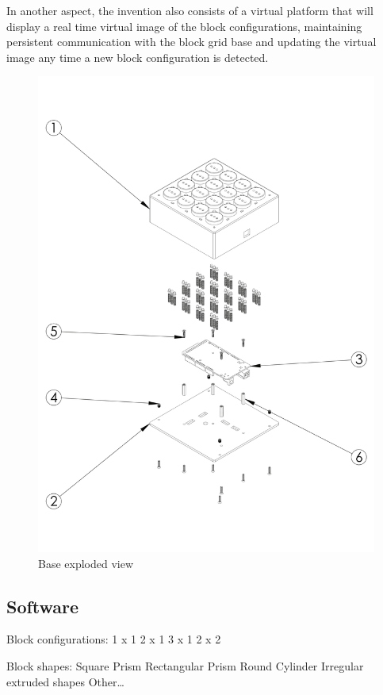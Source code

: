 \documentclass[]{article}
\begin{document}
In another aspect, the invention also consists of a virtual platform that will display a real time virtual image of the block configurations, maintaining persistent communication with the block grid base and updating the virtual image any time a new block configuration is detected.
\begin{figure}[H]
	\includegraphics[width=\textwidth]{Figures/base}
	\caption{Base exploded view}
\end{figure}

\subsection{Software}

Block configurations:
1 x 1
2 x 1
3 x 1
2 x 2

Block shapes:
Square Prism
Rectangular Prism
Round Cylinder
Irregular extruded shapes
Other…
\end{document}
